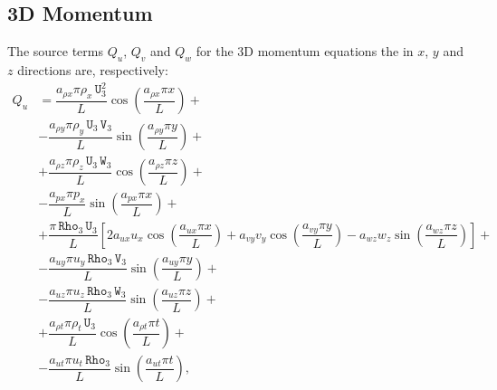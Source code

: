 \documentclass[10pt]{article}
\newcommand{\Rho}{\,\mathtt{Rho}}
\newcommand{\U}{\,\mathtt{U}}
\newcommand{\V}{\,\mathtt{V}}
\newcommand{\W}{\,\mathtt{W}}
\begin{document}
\subsection{3D Momentum}

The source terms $Q_{u}$, $Q_{v}$ and $Q_{w}$ for the 3D momentum equations the in $x$, $y$ and $z$ directions are, respectively:
\begin{equation}
 \begin{split}
Q_u &= \dfrac{a_{\rho x} \pi \rho_x \U_3^2 }{L}\cos\left(\dfrac{a_{\rho x} \pi x}{L}\right)+\\
&-\dfrac{a_{\rho y} \pi \rho_y \U_3 \V_3 }{L}\sin\left(\dfrac{a_{\rho y} \pi y}{L}\right)+\\
&+\dfrac{a_{\rho z} \pi \rho_z \U_3 \W_3 }{L}\cos\left(\dfrac{a_{\rho z}\pi z }{L}\right)+\\
&-\dfrac{a_{px} \pi p_x }{L}\sin\left(\dfrac{a_{px} \pi x}{L}\right)+\\
&+\dfrac{\pi \Rho_3 \U_3}{L}\left[2 a_{ux} u_x \cos\left(\dfrac{a_{ux} \pi x}{L}\right)+a_{vy} v_y \cos\left(\dfrac{a_{vy} \pi y}{L}\right)-a_{wz} w_z \sin\left(\dfrac{a_{wz}\pi z }{L}\right)\right]+\\
&-\dfrac{a_{uy} \pi u_y \Rho_3 \V_3}{L} \sin\left(\dfrac{a_{uy} \pi y}{L}\right)+\\
&-\dfrac{a_{uz} \pi u_z \Rho_3 \W_3 }{L}\sin\left(\dfrac{a_{uz}\pi z }{L}\right)+\\
&+  \dfrac{ a_{\rho t} \pi \rho_t \U_3}{L}\cos\left(\dfrac{a_{\rho t} \pi  t}{L}\right)+\\
&-\dfrac{a_{ut} \pi u_t \Rho_3 }{L}\sin\left(\dfrac{a_{ut} \pi  t}{L}\right),
 \end{split}
\end{equation}
\end{document}
